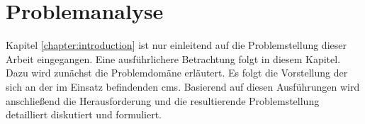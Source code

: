 \chapter{Problemanalyse}
    Kapitel \ref{chapter:introduction} ist nur einleitend
    auf die Problemstellung dieser Arbeit eingegangen.
    Eine ausführlichere Betrachtung folgt in diesem Kapitel.
    Dazu wird zunächst die Problemdomäne erläutert.
    Es folgt die Vorstellung der sich an der {\fernUni}
    im Einsatz befindenden \gls{cms}.
    Basierend auf diesen Ausführungen wird anschließend
    die Herausforderung und die resultierende Problemstellung
    detailliert diskutiert und formuliert.

    \label{chapter:ProblemAnalysis}
    
    
    
    
